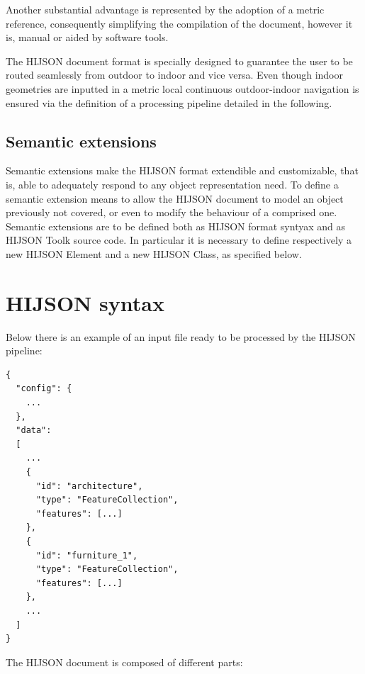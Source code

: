 \documentclass{sig-alternate}
\begin{document}
Another substantial advantage is represented by the adoption of a metric reference, 
consequently simplifying the compilation of the document, however it is, 
manual or aided by software tools.

The HIJSON document format is specially designed to guarantee the user to be routed seamlessly 
from outdoor to indoor and vice versa. Even though indoor geometries are inputted in a metric 
local continuous outdoor-indoor navigation is ensured via the definition of a processing pipeline
detailed in the following.

\subsection{Semantic extensions}\label{semantic-extensions}

Semantic extensions make the HIJSON format extendible and customizable, that
is, able to  adequately respond to any object representation need. To define a
semantic extension means to allow the HIJSON document to model an object
previously not covered, or even to modify the behaviour of a comprised one.
Semantic extensions are to be defined both as HIJSON format syntyax and as
HIJSON Toolk source code. In particular it is necessary to define respectively
a new HIJSON Element and a new HIJSON Class, as specified below.


\section{HIJSON syntax}\label{hijson-syntax}

Below there is an example of an input file ready to be processed by the HIJSON pipeline:

\begin{verbatim}
{
  "config": {
    ...
  },
  "data": 
  [
    ...
    {
      "id": "architecture",
      "type": "FeatureCollection",
      "features": [...] 
    },
    {
      "id": "furniture_1",
      "type": "FeatureCollection",
      "features": [...] 
    },
    ...
  ]
}
\end{verbatim}

The HIJSON document is composed of different parts:
\end{document}
